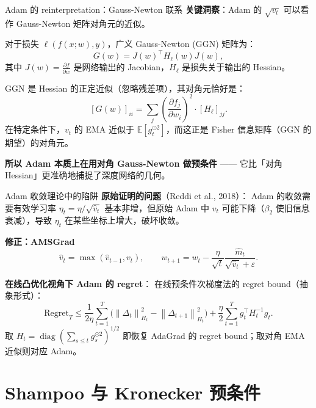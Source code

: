 \documentclass[aspectratio=169,10pt]{ctexbeamer}
\newcommand{\E}{\mathbb{E}}
\newcommand{\diag}{\operatorname{diag}}
\newcommand{\eps}{\varepsilon}
\newcommand{\norm}[1]{\left\lVert #1 \right\rVert}
\begin{document}
\begin{frame}{Adam 的 reinterpretation：Gauss-Newton 联系}
\textbf{关键洞察}：Adam 的 $\sqrt{v_t}$ 可以看作 Gauss-Newton 矩阵对角元的近似。

\vspace{0.2cm}
对于损失 $\ell(f(x;w),y)$，广义 Gauss-Newton (GGN) 矩阵为：
\[
  G(w) = J(w)^\top H_\ell(w) J(w),
\]
其中 $J(w)=\frac{\partial f}{\partial w}$ 是网络输出的 Jacobian，$H_\ell$ 是损失关于输出的 Hessian。

\vspace{0.2cm}
GGN 是 Hessian 的正定近似（忽略残差项），其对角元恰好是：
\[
  [G(w)]_{ii} = \sum_{j}\left(\frac{\partial f_j}{\partial w_i}\right)^2 \cdot [H_\ell]_{jj}.
\]
在特定条件下，$v_t$ 的 EMA 近似于 $\E[g_t^{\odot2}]$，而这正是 Fisher 信息矩阵（GGN 的期望）的对角元。

\vspace{0.2cm}
\textbf{所以 Adam 本质上在用对角 Gauss-Newton 做预条件} —— 它比「对角 Hessian」更准确地捕捉了深度网络的几何。
\end{frame}

\begin{frame}{Adam 收敛理论中的陷阱}
\textbf{原始证明的问题}（Reddi et al., 2018）：
Adam 的收敛需要有效学习率 $\eta_t = \eta/\sqrt{\hat v_t}$ 基本非增，但原始 Adam 中 $v_t$ 可能下降（$\beta_2$ 使旧信息衰减），导致 $\eta_t$ 在某些坐标上增大，破坏收敛。

\vspace{0.2cm}
\textbf{修正：AMSGrad}
\[
  \hat v_t = \max(\hat v_{t-1}, v_t),\qquad
  w_{t+1} = w_t - \frac{\eta}{\sqrt{t}}\frac{\hat m_t}{\sqrt{\hat v_t}+\eps}.
\]

\vspace{0.2cm}
\textbf{在线凸优化视角下 Adam 的 regret}：
在线预条件次梯度法的 regret bound（抽象形式）：
\[
  \text{Regret}_T \le \frac{1}{2\eta}\sum_{t=1}^T\big(\norm{\Delta_t}_{H_t}^2 - \norm{\Delta_{t+1}}_{H_t}^2\big)
  + \frac{\eta}{2}\sum_{t=1}^T g_t^\top H_t^{-1} g_t.
\]
取 $H_t=\diag(\sum_{s\le t}g_s^{\odot2})^{1/2}$ 即恢复 AdaGrad 的 regret bound；取对角 EMA 近似则对应 Adam。
\end{frame}

\section{Shampoo 与 Kronecker 预条件}
\end{document}
